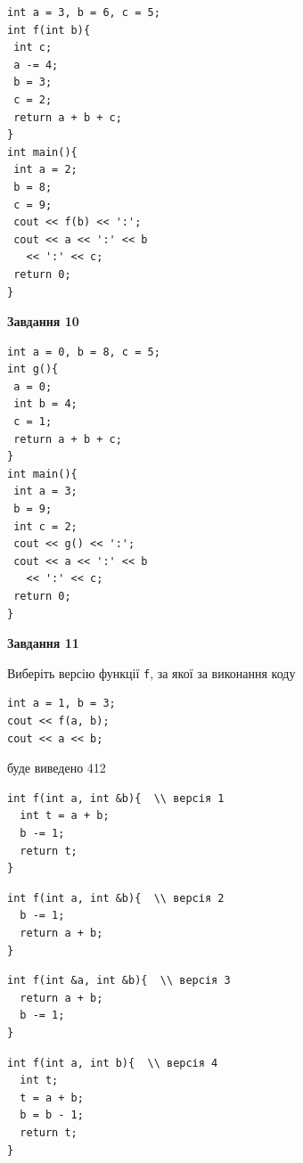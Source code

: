 \documentclass[12pt, ukrainian]{article}
\def\code#1{\Verb!#1!}
\begin{document}
{\begin {large}
\begin{minipage}[t]{7.0cm}
\begin{verbatim}
int a = 3, b = 6, c = 5;
int f(int b){
 int c;
 a -= 4;
 b = 3;
 c = 2;
 return a + b + c;
}
int main(){
 int a = 2;
 b = 8;
 c = 9;
 cout << f(b) << ':';
 cout << a << ':' << b 
   << ':' << c;
 return 0;
}
\end{verbatim}



\begin{center}
\textbf{Завдання 10}
\end{center}
\vspace{-8mm}

\begin{verbatim}
int a = 0, b = 8, c = 5;
int g(){
 a = 0;
 int b = 4;
 c = 1;
 return a + b + c;
}
int main(){
 int a = 3;
 b = 9;
 int c = 2;
 cout << g() << ':';
 cout << a << ':' << b 
   << ':' << c;
 return 0;
}
\end{verbatim}

\end{minipage}
\vline \hspace{1mm}
\begin{minipage}[t]{11.0cm}

\begin{center}
\textbf{Завдання 11}
\end{center}
Виберіть версію функції \code{f}, за якої за виконання коду
\begin{verbatim}
int a = 1, b = 3;
cout << f(a, b);
cout << a << b;
\end{verbatim}

буде виведено 412

\begin{verbatim}
int f(int a, int &b){  \\ версія 1
  int t = a + b;
  b -= 1;
  return t;
}
\end{verbatim}

\vspace{-8mm}\begin{verbatim}
int f(int a, int &b){  \\ версія 2
  b -= 1;
  return a + b;
}
\end{verbatim}

\vspace{-8mm}\begin{verbatim}
int f(int &a, int &b){  \\ версія 3
  return a + b;
  b -= 1;
}
\end{verbatim}

\vspace{-8mm}\begin{verbatim}
int f(int a, int b){  \\ версія 4
  int t;
  t = a + b;
  b = b - 1;
  return t;
}
\end{verbatim}




\end{minipage}
\end{large}}
\end{document}
